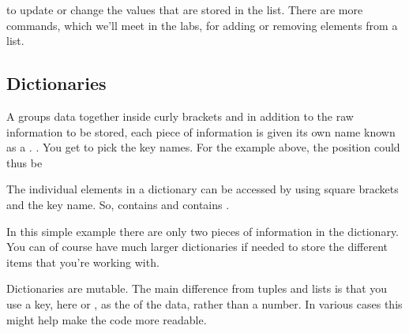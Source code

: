 \documentclass[letterpaper,10pt,british]{sphinxmanual}
\begin{document}
\sphinxAtStartPar
to update or change the values that are stored in the list. There are more commands, which we’ll meet in the labs, for adding or removing elements from a list.


\subsection{Dictionaries}
\label{\detokenize{chapters/programming_fundamentals/variables:dictionaries}}\label{\detokenize{chapters/programming_fundamentals/variables:id4}}
\sphinxAtStartPar
A  groups data together inside curly brackets  and in addition to the raw information to be stored, each piece of information is given its own name known as a . . You get to pick the key names. For the example above, the position could thus be

\begin{sphinxVerbatim}[commandchars=\\\{\}]
     
\end{sphinxVerbatim}

\sphinxAtStartPar
The individual elements in a dictionary can be accessed by using square brackets  and the key name. So,  contains  and  contains .

\sphinxAtStartPar
In this simple example there are only two pieces of information in the dictionary. You can of course have much larger dictionaries if needed to store the different items that you’re working with.

\sphinxAtStartPar
Dictionaries are mutable. The main difference from tuples and lists is that you use a key, here  or , as the  of the data, rather than a number. In various cases this might help make the code more readable.
\end{document}
